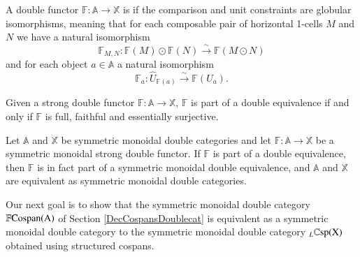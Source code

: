 \documentclass{amsart}
\begin{document}
\begin{defn}
A double functor $\mathbb{F} \colon \mathbb{A} \to \mathbb{X}$ is  if the comparison and unit constraints are globular isomorphisms, meaning that for each composable pair of horizontal 1-cells $M$ and $N$ we have a natural isomorphism $$\mathbb{F}_{M,N} \colon \mathbb{F}(M) \odot \mathbb{F}(N) \xrightarrow{\sim} \mathbb{F}(M \odot N)$$and for each object $a \in \mathbb{A}$ a natural isomorphism $$\mathbb{F}_a \colon \hat{U}_{\mathbb{F}(a)} \xrightarrow{\sim} \mathbb{F}(U_a).$$
\end{defn}
\begin{thm}[Shulman,7.8]\label{ShulDubEquiv}
Given a strong double functor $\mathbb{F} \colon \mathbb{A} \to \mathbb{X}$, $\mathbb{F}$ is part of a double equivalence if and only if $\mathbb{F}$ is full, faithful and essentially surjective.
\end{thm}
\begin{prop}
Let $\mathbb{A}$ and $\mathbb{X}$ be symmetric monoidal double categories and let $\mathbb{F} \colon \mathbb{A} \to \mathbb{X}$ be a symmetric monoidal strong double functor. If $\mathbb{F}$ is part of a double equivalence, then $\mathbb{F}$ is in fact part of a symmetric monoidal double equivalence, and $\mathbb{A}$ and $\mathbb{X}$ are equivalent as symmetric monoidal double categories.
\end{prop}
Our next goal is to show that the symmetric monoidal double category $\mathbb{F}\textnormal{Cospan}(\mathrm{A})$ of Section \ref{DecCospansDoublecat} is equivalent as a symmetric monoidal double category to the symmetric monoidal double category $_L \mathbb{C}\textnormal{sp}(\mathrm{X})$ obtained using structured cospans.
\end{document}
